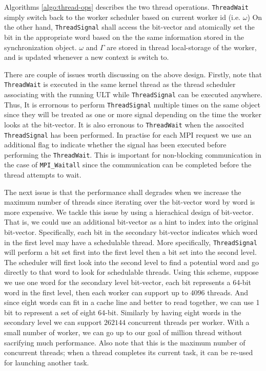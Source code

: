 \documentclass{sig-alternate-05-2015}
\begin{document}
Algorithms \ref{algo:thread-ops} describes the two thread operations.
\texttt{ThreadWait} simply switch back to the worker scheduler based on current
worker id (i.e. $\omega$) On the other hand, \texttt{ThreadSignal} shall access
the bit-vector and atomically set the bit in the appropriate word based on the
the same information stored in the synchronization object. $\omega$ and
$\Gamma$ are stored in thread local-storage of the worker, and is updated
whenever a new context is switch to.

There are couple of issues worth discussing on the above design.  Firstly, note
that \texttt{ThreadWait} is executed in the same kernel thread as the thread
scheduler associating with the running ULT while \texttt{ThreadSignal} can be
executed anywhere. Thus, It is errornous to perform \texttt{ThreadSignal}
multiple times on the same object since they will be treated as one or more
signal depending on the time the worker looks at the bit-vector. It is also
erronous to \texttt{ThreadWait} when the associted \texttt{ThreadSignal} has
been performed. In practise for each MPI request we use an additional flag to
indicate whether the signal has been executed before performing the
\texttt{ThreadWait}. This is important for non-blocking communication in the
case of \texttt{MPI_Waitall} since the communication can be completed before
the thread attempts to wait.

The next issue is that the performance shall degrades when we increase the
maximum number of threads since iterating over the bit-vector word by word is
more expensive. We tackle this issue by using a hierachical design of
bit-vector.  That is, we could use an additional bit-vector as a hint to index
into the original bit-vector. Specifically, each bit in the secondary
bit-vector indicates which word in the first level may have a schedulable
thread. More specifically, \texttt{ThreadSignal} will perform a bit set first
into the first level then a bit set into the second level. The scheduler will
first look into the second level to find a potential word and go directly to
that word to look for schedulable threads. %
Using this scheme, suppose we use one word for the secondary level bit-vector,
each bit represents a 64-bit word in the first level, then each worker can
support up to $4096$ threads. And since eight words can fit in a cache line and
better to read together, we can use 1 bit to represent a set of eight 64-bit.
Similarly by having eight words in the secondary level we can support $262144$
concurrent threads per worker. With a small number of worker, we can go up to
our goal of million thread without sacrifying much performance. Also note that
this is the maximum number of concurrent threads; when a thread completes its
current task, it can be re-used for launching another task.
\end{document}
